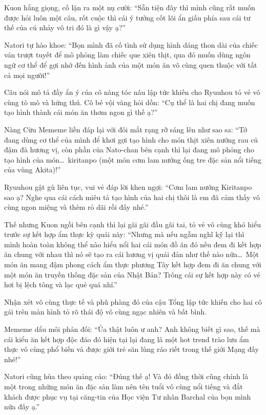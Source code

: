 \documentclass[../main.tex]{subfiles}
\begin{document}
Kuon hắng giọng, cố lặn ra một nụ cười: ``Sẵn tiện đây thì mình cũng rất muốn được hỏi luôn một câu, rốt cuộc thì cái ý tưởng cốt lõi ẩn giấu phía sau cái tư thế của cú nhảy vô tri đó là gì vậy ạ?''

Natori tự hào khoe: ``Bọn mình đã cố tình sử dụng hình dáng thon dài của chiếc ván trượt tuyết để mô phỏng làm chiếc que xiên thịt, qua đó muốn dùng ngôn ngữ cơ thể để gợi nhớ đến hình ảnh của một món ăn vô cùng quen thuộc với tất cả mọi người!''

Câu nói mô tả đầy ẩn ý của cô nàng tóc nâu lập tức khiến cho Ryuuhou tỏ vẻ vô cùng tò mò và hứng thú. Cô bé vội vàng hỏi dồn: ``Cụ thể là hai chị đang muốn tạo hình thành cái món ăn thơm ngon gì thế ạ?''

Nàng Cừu Mememe liền đáp lại với đôi mắt rạng rỡ sáng lên như sao sa: ``Tớ đang dùng cơ thể của mình để khơi gợi tạo hình cho món thịt xiên nướng rau củ đậm đà hương vị, còn phần của Nato-chan bên cạnh thì lại đang mô phỏng cho tạo hình của món\dots\ kiritanpo (một món cơm lam nướng ống tre đặc sản nổi tiếng của vùng Akita)!''

Ryuuhou gật gù liên tục, vui vẻ đáp lời khen ngợi: ``Cơm lam nướng Kiritanpo sao ạ? Nghe qua cái cách miêu tả tạo hình của hai chị thôi là em đã cảm thấy vô cùng ngon miệng và thèm rỏ dãi rồi đấy nhé.''

Thế nhưng Kuon ngồi bên cạnh thì lại gãi gãi đầu gãi tai, tỏ vẻ vô cùng khó hiểu trước sự kết hợp ẩm thực kỳ quái này: ``Nhưng mà nếu ngẫm nghĩ kỹ lại thì mình hoàn toàn không thể nào hiểu nổi hai cái món đồ ăn đó nếu đem đi kết hợp ăn chung với nhau thì nó sẽ tạo ra cái hương vị quái đản như thế nào nữa\dots\ Một món ăn mang đậm phong cách ẩm thực phương Tây kết hợp đem đi ăn chung với một món ăn truyền thống đặc sản của Nhật Bản? Trông cái sự kết hợp này có vẻ hơi bị lệch tông và lạc quẻ quá nhỉ.''

Nhận xét vô cùng thực tế và phũ phàng đó của cậu Tổng lập tức khiến cho hai cô gái trên màn hình tỏ rõ thái độ vô cùng ngạc nhiên và bất bình.

Mememe dẩu môi phản đối: ``Ủa thật luôn ư anh? Anh không biết gì sao, thế mà cái kiểu ăn kết hợp độc đáo đó hiện tại lại đang là một hot trend trào lưu ẩm thực vô cùng phổ biến và được giới trẻ săn lùng ráo riết trong thế giới Mạng đấy nhé!''

Natori cũng hùa theo quảng cáo: ``Đúng thế ạ! Và đó đồng thời cũng chính là một trong những món ăn đặc sản làm nên tên tuổi vô cùng nổi tiếng và đắt khách được phục vụ tại căng-tin của Học viện Tư nhân Barchal của bọn mình nữa đấy ạ.''
\end{document}

